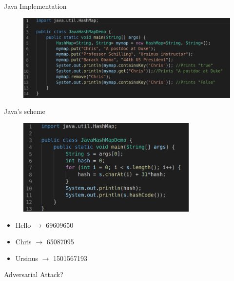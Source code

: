\documentclass{beamer}
\begin{document}
\begin{frame}{Java Implementation}

\begin{figure}
	\centering
	\includegraphics[width=\textwidth]{JavaHash.png}
\end{figure}

\end{frame}


\begin{frame}{Java's scheme}

\begin{figure}
	\centering
	\includegraphics[width=0.8\textwidth]{JavaHash31.png}
\end{figure}

\begin{itemize}
    \item Hello $\rightarrow$ 69609650
    \item Chris $\rightarrow$ 65087095
    \item Ursinus $\rightarrow$ 1501567193
\end{itemize}

\end{frame}


\begin{frame}{Adversarial Attack?}


\end{frame}
\end{document}
